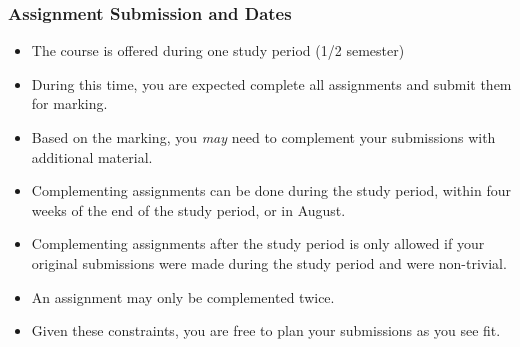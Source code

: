 \documentclass[10pt]{beamer}
\begin{document}
\begin{frame}[t]
\frametitle{Assignment Submission and Dates}
\begin{itemize}
\item The course is offered during one study period (1/2 semester)
\item During this time, you are expected complete all assignments and submit them for marking.
\item Based on the marking, you \emph{may} need to complement your submissions with additional material.
\item Complementing assignments can be done during the study period, within four weeks of the end of the study period, or in August.
\item Complementing assignments after the study period is only allowed if your original submissions were made during the study period and were non-trivial.
\item An assignment may only be complemented twice.
\item Given these constraints, you are free to plan your submissions as you see fit.
\end{itemize}
\end{frame}


\end{document}
